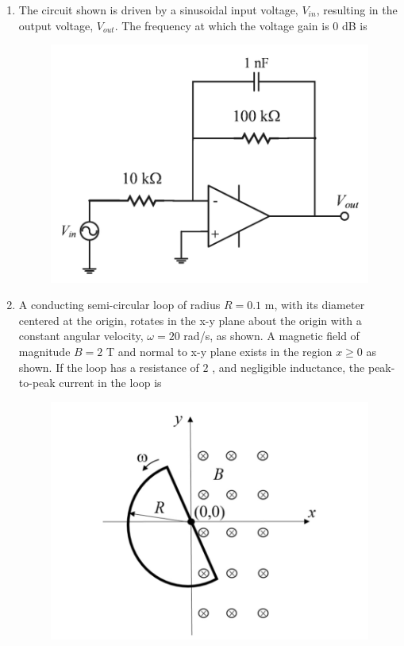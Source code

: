 \documentclass[journal,12pt,onecolumn]{IEEEtran}
\theoremstyle{remark}
\begin{document}
\begin{enumerate}
\item The circuit shown is driven by a sinusoidal input voltage, $V_{in}$, resulting in the output voltage, $V_{out}$. The frequency  at which the voltage gain is $0$ dB is \underline{\hspace{2cm}} 

\hfill{}
\begin{figure}[H]
\includegraphics[width = 0.7\columnwidth]{q56}
\caption*{}
\label{q56}
\end{figure}

\item A conducting semi-circular loop of radius $R = 0.1$ m, with its diameter centered at the origin, rotates in the x-y plane about the origin with a constant angular velocity, $\omega = 20$ rad/s, as shown. A magnetic field of magnitude $B = 2$ T and normal to x-y plane exists in the region $x \ge 0$ as shown. If the loop has a resistance of $2$ \ohm, and negligible inductance, the peak-to-peak current  in the loop is \underline{\hspace{2cm}} 

\hfill{}
\begin{figure}[H]
\includegraphics[width = 0.5\columnwidth]{q57}
\caption*{}
\label{q57}
\end{figure}


\end{enumerate}
\end{document}
